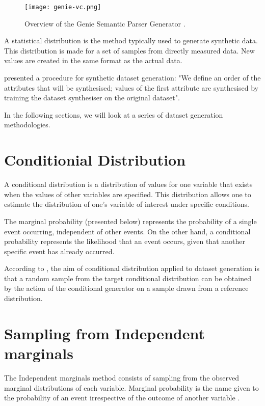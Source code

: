 \begin{figure}
    \centering
    \texttt{[image: genie-vc.png]}
    \caption[Overview of the Genie Semantic Parser Generator]{Overview of the Genie Semantic Parser Generator \citep{campagna2019genie}.}
    \label{fig:genie}
\end{figure}

A statistical distribution is the method typically used to generate synthetic data. This distribution is made for a set of samples from directly measured data. New values are created in the same format as the actual data. 

\cite{drechsler2010using} presented a procedure for synthetic dataset generation: "We define an order of the attributes that will be synthesised; values of the first attribute are synthesised by training the dataset synthesiser on the original dataset".

In the following sections, we will look at a series of dataset generation methodologies.

\section{Conditionial Distribution}
A conditional distribution is a distribution of values for one variable that exists when the values of other variables are specified. This distribution allows one to estimate the distribution of one's variable of interest under specific conditions.

The marginal probability (presented below) represents the probability of a single event occurring, independent of other events. On the other hand, a conditional probability represents the likelihood that an event occurs, given that another specific event has already occurred.

According to \cite{cond}, the aim of conditional distribution applied to dataset generation is that a random sample from the target conditional distribution can be obtained by the action of the conditional generator on a sample drawn from a reference distribution.

\section{Sampling from Independent marginals}
The Independent marginals method consists of sampling from the observed marginal distributions of each variable. Marginal probability is the name given to the probability of an event irrespective of the outcome of another variable \citep{indmargins}. 


